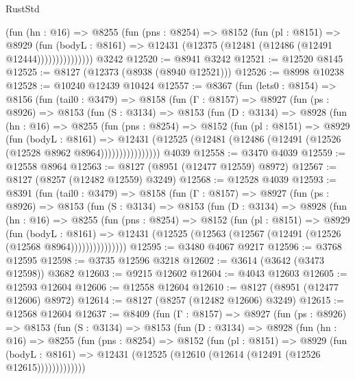 \begin{lexlean}{RustStd}
\begin{coremodule}
                  (fun (hn : @16) =>
                  @8255
                    (fun (pns : @8254) =>
                    @8152
                      (fun (pl : @8151) =>
                      @8929
                        (fun (bodyL : @8161) =>
                        @12431 (@12375 (@12481 (@12486 (@12491 @12444)))))))))))))))
    @3242
@12520 := @8941 @3242
@12521 := @12520 @8145
@12525 := @8127 (@12373 (@8938 (@8940 @12521)))
@12526 := @8998 @10238
@12528 := @10240 @12439 @10424
@12557 := @8367
    (fun (lets0 : @8154) =>
    @8156
      (fun (tail0 : @3479) =>
      @8158
        (fun (Γ : @8157) =>
        @8927
          (fun (ps : @8926) =>
          @8153
            (fun (S : @3134) =>
            @8153
              (fun (D : @3134) =>
              @8928
                (fun (hn : @16) =>
                @8255
                  (fun (pns : @8254) =>
                  @8152
                    (fun (pl : @8151) =>
                    @8929
                      (fun (bodyL : @8161) =>
                      @12431
                        (@12525 (@12481 (@12486 (@12491 (@12526 (@12528 @8962 @8964))))))))))))))))
    @4039
@12558 := @3470 @4039
@12559 := @12558 @8964
@12563 := @8127 (@8951 (@12477 @12559) @8972)
@12567 := @8127 (@8257 (@12482 @12559) @3249)
@12568 := @12528 @4039
@12593 := @8391
    (fun (tail0 : @3479) =>
    @8158
      (fun (Γ : @8157) =>
      @8927
        (fun (ps : @8926) =>
        @8153
          (fun (S : @3134) =>
          @8153
            (fun (D : @3134) =>
            @8928
              (fun (hn : @16) =>
              @8255
                (fun (pns : @8254) =>
                @8152
                  (fun (pl : @8151) =>
                  @8929
                    (fun (bodyL : @8161) =>
                    @12431 (@12525 (@12563 (@12567 (@12491 (@12526 (@12568 @8964)))))))))))))))
@12595 := @3480 @4067 @9217
@12596 := @3768 @12595
@12598 := @3735 @12596 @3218
@12602 := @3614 (@3642 (@3473 @12598)) @3682
@12603 := @9215 @12602
@12604 := @4043 @12603
@12605 := @12593 @12604
@12606 := @12558 @12604
@12610 := @8127 (@8951 (@12477 @12606) @8972)
@12614 := @8127 (@8257 (@12482 @12606) @3249)
@12615 := @12568 @12604
@12637 := @8409
    (fun (Γ : @8157) =>
    @8927
      (fun (ps : @8926) =>
      @8153
        (fun (S : @3134) =>
        @8153
          (fun (D : @3134) =>
          @8928
            (fun (hn : @16) =>
            @8255
              (fun (pns : @8254) =>
              @8152
                (fun (pl : @8151) =>
                @8929
                  (fun (bodyL : @8161) =>
                  @12431 (@12525 (@12610 (@12614 (@12491 (@12526 @12615)))))))))))))

\end{coremodule}
\end{lexlean}
